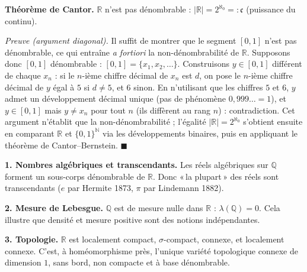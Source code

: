 
\begin{mdframed}[style=proofbar]
  \textbf{Théorème de Cantor.}\enspace%
  $\mathbb{R}$ n'est pas dénombrable : $|\mathbb{R}| = 2^{\aleph_0} =: \mathfrak{c}$
  (puissance du continu).

  \textit{Preuve (argument diagonal).}
  Il suffit de montrer que le segment $[0,1]$ n'est pas dénombrable, ce qui
  entraîne \emph{a fortiori} la non-dénombrabilité de $\mathbb{R}$. Supposons donc
  $[0,1]$ dénombrable : $[0,1] = \{x_1, x_2, \ldots\}$.
  Construisons $y \in [0,1]$ différent de chaque $x_n$ : si le $n$-ième chiffre
  décimal de $x_n$ est $d$, on pose le $n$-ième chiffre décimal de $y$ égal à
  $5$ si $d \neq 5$, et $6$ sinon. En n'utilisant que les chiffres $5$ et $6$,
  $y$ admet un développement décimal unique (pas de phénomène $0{,}999\ldots=1$),
  et $y \in [0,1]$ mais $y \neq x_n$ pour tout $n$ (ils diffèrent au rang $n$) :
  contradiction. Cet argument n'établit que la non-dénombrabilité ; l'égalité
  $|\mathbb{R}| = 2^{\aleph_0}$ s'obtient ensuite en comparant $\mathbb{R}$ et
  $\{0,1\}^{\mathbb{N}}$ via les développements binaires, puis en appliquant le
  théorème de Cantor--Bernstein.
  \hfill$\blacksquare$
\end{mdframed}

\decsep{}



\begin{mdframed}[style=exbar]
  \textbf{1. Nombres algébriques et transcendants.}\enspace%
  Les réels algébriques sur $\mathbb{Q}$ forment un sous-corps dénombrable de $\mathbb{R}$.
  Donc «\,la plupart\,» des réels sont transcendants ($e$ par Hermite 1873,
  $\pi$ par Lindemann 1882).

  \smallskip\noindent
  \textbf{2. Mesure de Lebesgue.}\enspace%
  $\mathbb{Q}$ est de mesure nulle dans $\mathbb{R}$ : $\lambda(\mathbb{Q}) = 0$.
  Cela illustre que densité et mesure positive sont des notions indépendantes.

  \smallskip\noindent
  \textbf{3. Topologie.}\enspace%
  $\mathbb{R}$ est localement compact, $\sigma$-compact, connexe, et localement
  connexe. C'est, à homéomorphisme près, l'unique variété topologique connexe
  de dimension $1$, sans bord, non compacte et à base dénombrable.
\end{mdframed}

